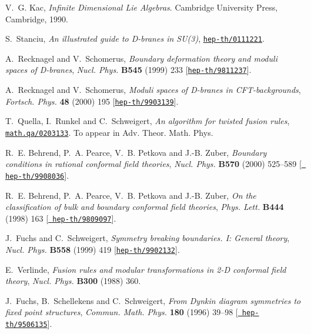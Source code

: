 \documentclass[12pt,a4paper]{article}
\begin{document}
\begin{thebibliography}{10}
V.~G. Kac, {\em Infinite Dimensional {Lie} Algebras}.
\newblock Cambridge University Press, Cambridge, 1990.

S.~Stanciu, {\it An illustrated guide to {D-branes} in {SU(3)}},
  \href{http://arXiv.org/abs/hep-th/0111221}{{\tt hep-th/0111221}}.

A.~Recknagel and V.~Schomerus, {\it Boundary deformation theory and moduli
  spaces of {D}-branes},  {\em Nucl. Phys.} {\bf B545} (1999) 233
  [\href{http://arXiv.org/abs/hep-th/9811237}{{\tt hep-th/9811237}}].

A.~Recknagel and V.~Schomerus, {\it Moduli spaces of {D-branes} in
  {CFT-backgrounds}},  {\em Fortsch. Phys.} {\bf 48} (2000) 195
  [\href{http://arXiv.org/abs/hep-th/9903139}{{\tt hep-th/9903139}}].

T.~Quella, I.~Runkel and C.~Schweigert, {\it An algorithm for twisted fusion
  rules},  \href{http://arXiv.org/abs/math.qa/0203133}{{\tt math.qa/0203133}}.
  To appear in Adv. Theor. Math. Phys.

R.~E. Behrend, P.~A. Pearce, V.~B. Petkova and J.-B. Zuber, {\it Boundary
  conditions in rational conformal field theories},  {\em Nucl. Phys.} {\bf
  B570} (2000) 525--589 [\href{http://arXiv.org/abs/hep-th/9908036}{{\tt
  hep-th/9908036}}].

R.~E. Behrend, P.~A. Pearce, V.~B. Petkova and J.-B. Zuber, {\it On the
  classification of bulk and boundary conformal field theories},  {\em Phys.
  Lett.} {\bf B444} (1998) 163 [\href{http://arXiv.org/abs/hep-th/9809097}{{\tt
  hep-th/9809097}}].

J.~Fuchs and C.~Schweigert, {\it Symmetry breaking boundaries. {I: General}
  theory},  {\em Nucl. Phys.} {\bf B558} (1999) 419
  [\href{http://arXiv.org/abs/hep-th/9902132}{{\tt hep-th/9902132}}].

E.~Verlinde, {\it Fusion rules and modular transformations in 2-{D} conformal
  field theory},  {\em Nucl. Phys.} {\bf B300} (1988) 360.

J.~Fuchs, B.~Schellekens and C.~Schweigert, {\it From {Dynkin} diagram
  symmetries to fixed point structures},  {\em Commun. Math. Phys.} {\bf 180}
  (1996) 39--98 [\href{http://arXiv.org/abs/hep-th/9506135}{{\tt
  hep-th/9506135}}].


\end{thebibliography}
\end{document}
